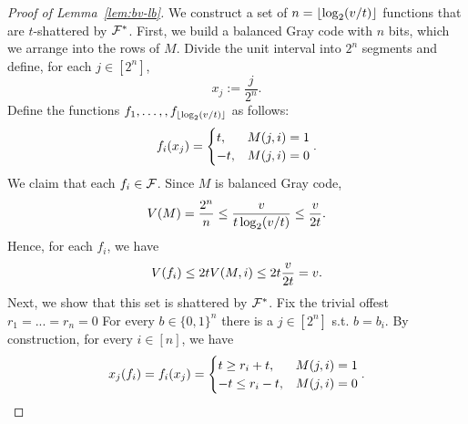 \documentclass[12pt,a4paper,oneside,onecolumn]{book}
\begin{document}
\begin{proof}[Proof of Lemma~\ref{lem:bv-lb}]
  We construct a set of $n = \left\lfloor\log_2(v/t)\right\rfloor$ functions that are $t$-shattered by $\mathcal{F}^*$.
  First, we build a balanced Gray code \citep{flahive2007balancing} with $n$ bits,
which we arrange into the rows of $M$.
Divide the unit interval into $2^n
$ segments and define, for each $j\in[2^n]$,
\[
x_j := \frac{j}{2^n}
.
\]
  Define the functions $f_1,\ldots,,f_{\left\lfloor\log_2(v/t)\right\rfloor}$ as follows:
  \[f_i(x_j) =
    \begin{cases}
      t, &
      M(j,i)
      = 1
      \\
      -t, &
      M(j,i)
      = 0
    \end{cases}.
  \]
We claim that each
$
f_i \in \mathcal{F}$.
Since
$M$ is balanced Gray code,
\[V(M) = \frac{2^n}{n} \le \frac{v}{t \log_2(v/t)} \leq \frac{v}{2t}.\]
Hence, for each
$f_i$,
we have
  \[V(f_i) \leq 2 t V(M,i) \leq 2 t \frac{v}{2t} = v.\]
Next, we show
that this set is shattered by $\mathcal{F}^*$.
Fix the trivial offest $r_1=...=r_n = 0$
For every $b \in \{0,1\}^n$ there is a $j \in [2^n]$ s.t. $b = b_i$.
By construction,
for every
$i \in [n]$,
we have
  \[x_j(f_i) = f_i(x_j) =
    \begin{cases}
      t \geq r_i + t, & M(j,i)
              = 1 \\
              -t \leq r_i - t, & M(j,i)
              = 0
    \end{cases}.
  \]
\end{proof}



    
\end{document}
